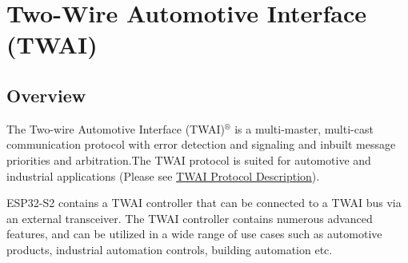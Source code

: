 \documentclass[main\_\_EN.tex]{subfiles}
\begin{document}

\ifglobal
\else
    {\let\clearpage\relax \listoftodos}
    {\let\clearpage\relax \listofdonetodos}
    \tableofcontents
    \listoftables
    \listoffigures
\fi



\hypertarget{twai}{}
\chapter{Two-Wire Automotive Interface (TWAI)}
\label{mod:twai}

\section{Overview}

The Two-wire Automotive Interface (TWAI)$^\circledR$ is a multi-master, multi-cast communication protocol with error detection and signaling and inbuilt message priorities and arbitration.The TWAI protocol is suited for automotive and industrial applications (Please see \hyperref[subsec:protocol-description]{TWAI Protocol Description}).

ESP32-S2 contains a TWAI controller that can be connected to a TWAI bus via an external transceiver. The TWAI controller contains numerous advanced features, and can be utilized in a wide range of use cases such as automotive products, industrial automation controls, building automation etc.
\end{document}
